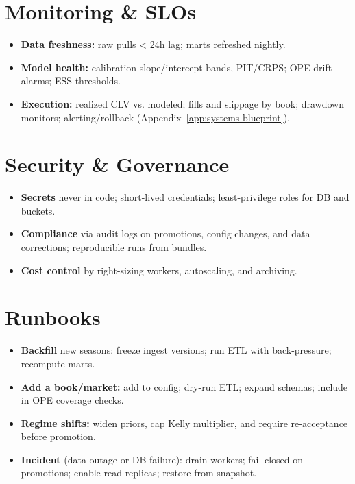 \section{Monitoring \& SLOs}
\begin{itemize}
  \item \textbf{Data freshness:} raw pulls < 24h lag; marts refreshed nightly.
  \item \textbf{Model health:} calibration slope/intercept bands, PIT/CRPS; OPE drift alarms; ESS thresholds.
  \item \textbf{Execution:} realized CLV vs. modeled; fills and slippage by book; drawdown monitors; alerting/rollback (Appendix~\ref{app:systems-blueprint}).
\end{itemize}

\section{Security \& Governance}
\begin{itemize}
  \item \textbf{Secrets} never in code; short-lived credentials; least-privilege roles for DB and buckets.
  \item \textbf{Compliance} via audit logs on promotions, config changes, and data corrections; reproducible runs from bundles.
  \item \textbf{Cost control} by right-sizing workers, autoscaling, and archiving.
\end{itemize}

\section{Runbooks}
\begin{itemize}
  \item \textbf{Backfill} new seasons: freeze ingest versions; run ETL with back-pressure; recompute marts.
  \item \textbf{Add a book/market:} add to config; dry-run ETL; expand schemas; include in OPE coverage checks.
  \item \textbf{Regime shifts:} widen priors, cap Kelly multiplier, and require re-acceptance before promotion.
  \item \textbf{Incident} (data outage or DB failure): drain workers; fail closed on promotions; enable read replicas; restore from snapshot.
\end{itemize}

